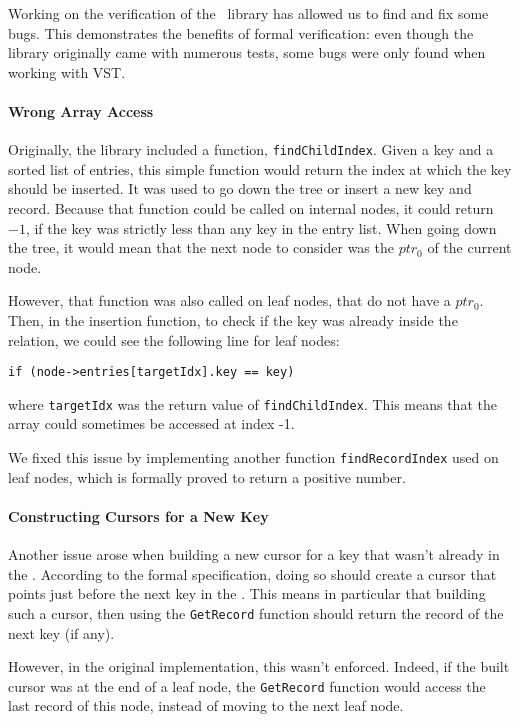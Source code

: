 Working on the verification of the \btrees\ library has allowed us to find and fix some bugs.
This demonstrates the benefits of formal verification: even though the library originally came with numerous tests, some bugs were only found when working with VST.

\paragraph{Wrong Array Access} Originally, the library included a function, \lstinline{findChildIndex}.
Given a key and a sorted list of entries, this simple function would return the index at which the key should be inserted.
It was used to go down the tree or insert a new key and record.
Because that function could be called on internal nodes, it could return $-1$, if the key was strictly less than any key in the entry list.
When going down the tree, it would mean that the next node to consider was the $ptr_0$ of the current node.

However, that function was also called on leaf nodes, that do not have a $ptr_0$.
Then, in the insertion function, to check if the key was already inside the relation, we could see the following line for leaf nodes:
\begin{lstlisting}
if (node->entries[targetIdx].key == key)
\end{lstlisting}
where \lstinline{targetIdx} was the return value of \lstinline{findChildIndex}.
This means that the array could sometimes be accessed at index -1.

We fixed this issue by implementing another function \lstinline{findRecordIndex} used on leaf nodes, which is formally proved to return a positive number.

\paragraph{Constructing Cursors for a New Key}
Another issue arose when building a new cursor for a key that wasn't already in the \btree.
According to the formal specification, doing so should create a cursor that points just before the next key in the \btree.
This means in particular that building such a cursor, then using the \lstinline{GetRecord} function should return the record of the next key (if any).

However, in the original implementation, this wasn't enforced.
Indeed, if the built cursor was at the end of a leaf node, the \lstinline{GetRecord} function would access the last record of this node, instead of moving to the next leaf node.

